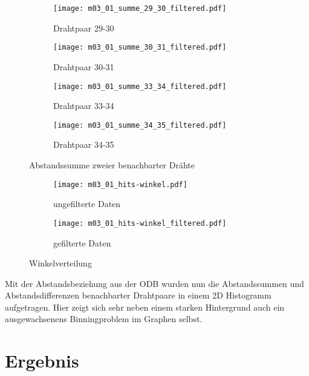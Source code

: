 \documentclass[11pt, ngerman, fleqn, DIV=15, headinclude, BCOR=2cm]{scrreprt}
\begin{document}
\begin{figure}
	\centering
	\begin{subfigure}{0.49 \linewidth}
		\texttt{[image: m03\_01\_summe\_29\_30\_filtered.pdf]}
		\caption{%
			Drahtpaar 29-30
		}
		\label{fig:m03_summe_29_30}
	\end{subfigure}
	\begin{subfigure}{0.49 \linewidth}
		\texttt{[image: m03\_01\_summe\_30\_31\_filtered.pdf]}
		\caption{%
			Drahtpaar 30-31
		}
		\label{fig:m03_summe_30_31}
	\end{subfigure}
	\begin{subfigure}{0.49 \linewidth}
		\texttt{[image: m03\_01\_summe\_33\_34\_filtered.pdf]}
		\caption{%
			Drahtpaar 33-34
		}
		\label{fig:m03_summe_33_34}
	\end{subfigure}
	\begin{subfigure}{0.49 \linewidth}
		\texttt{[image: m03\_01\_summe\_34\_35\_filtered.pdf]}
		\caption{%
			Drahtpaar 34-35
		}
		\label{fig:m03_summe_34_35}
	\end{subfigure}
\caption{%
		Abstandssumme zweier benachbarter Drähte
	}
	\label{fig:m03_ort_driftzeit}
\end{figure}

\begin{figure}
	\centering
	\begin{subfigure}{0.49 \linewidth}
		\texttt{[image: m03\_01\_hits-winkel.pdf]}
		\caption{%
			ungefilterte Daten
		}
		\label{fig:m03_hits-winkel}
	\end{subfigure}
	\begin{subfigure}{0.49 \linewidth}
		\texttt{[image: m03\_01\_hits-winkel\_filtered.pdf]}
		\caption{%
			gefilterte Daten
		}
		\label{fig:m03_hits-winkel_filtered}
	\end{subfigure}
	\caption{%
		Winkelverteilung
	}
	\label{fig:m03_winkelverteilung}
\end{figure}


Mit der Abstandsbeziehung aus der ODB wurden nun die Abstandssummen und
Abstandsdifferenzen benachbarter Drahtpaare in einem 2D Histogramm
aufgetragen.
Hier zeigt sich sehr neben einem starken Hintergrund auch ein
ausgewachsenens Binningproblem im Graphen selbst.



\chapter{Ergebnis}
\end{document}
